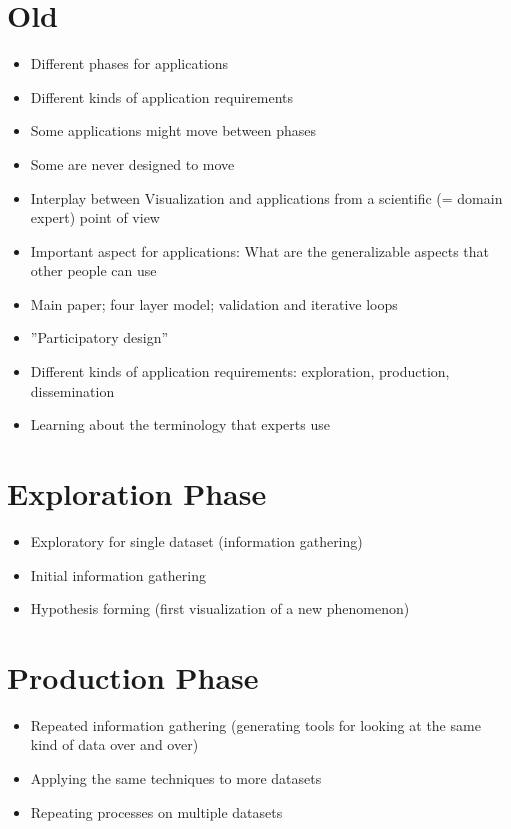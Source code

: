 \section*{Old}

\begin{itemize}
\item Different phases for applications
\item Different kinds of application requirements
\item Some applications might move between phases
\item Some are never designed to move
\item Interplay between Visualization and applications from a scientific (= domain expert) point of view
\item Important aspect for applications: What are the generalizable aspects that other people can use
\item \cite{munzner2009nested} Main paper; four layer model; validation and iterative loops
\item ''Participatory design''
\item Different kinds of application requirements: exploration, production, dissemination
\item Learning about the terminology that experts use
\end{itemize}

\section{Exploration Phase}
\begin{itemize}
\item Exploratory for single dataset (information gathering)
\item Initial information gathering
\item Hypothesis forming (first visualization of a new phenomenon)
\end{itemize}

\section{Production Phase}
\begin{itemize}
\item Repeated information gathering (generating tools for looking at the same kind of data over and over)
\item Applying the same techniques to more datasets
\item Repeating processes on multiple datasets
\end{itemize}


